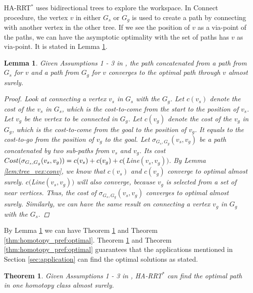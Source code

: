 \documentclass[letterpaper, 10 pt, conference]{ieeeconf}
\newtheorem{thm}{Theorem}
\newtheorem{lem}{Lemma}
\begin{document}
HA-RRT$^{*}$ uses bidirectional trees to explore the workspace.
In {\sc Connect} procedure, the vertex $ v $ in either $ G_{s} $ or $ G_{g} $ is used to create a path by connecting with another vertex in the other tree.
If we see the position of $ v $ as a via-point of the paths, we can have the asymptotic optimality with the set of paths has $ v $ as via-point.
It is stated in Lemma \ref{lem:optimal_via_point}.

\begin{lem}
\label{lem:optimal_via_point}
Given Assumptions 1 - 3 in \cite{Karaman-RSS-10},
the path concatenated from a path from $ G_{s} $ for $ v $ and a path from $ G_{g} $ for $ v $ converges to the optimal path through $ v $ almost surely. 

\begin{proof}
Look at connecting a vertex $ v_{s} $ in $ G_{s} $ with the $ G_{g} $.
Let $ c (v_{s}) $ denote the cost of the $  v_{s}  $ in $ G_{s} $, which is the cost-to-come from the start to the position of $  v_{s} $.
Let $ v_{g} $ be the vertex to be connected in $ G_{g} $.
Let $ c ( v_{g} ) $ denote the cost of the $  v_{g} $ in $ G_{g} $, which is the cost-to-come from the goal to the position of $  v_{g} $.
It equals to the cost-to-go from the position of $ v_{g} $ to the goal.
Let $ \sigma_{G_{s},G_{g}} (v_{s}, v_{g}) $ be a path concatenated by two sub-paths from $  v_{s} $ and $  v_{g} $. 
Its cost $ {\sc Cost} (\sigma_{G_{s},G_{g}} ( v_{s}, v_{g} )) =  c (v_{s}) + c (v_{g}) + c (${\sc Line}$ (v_{s}, v_{g})  ) $.
By Lemma \ref{lem:tree_vex:conv}, we know that $ c (v_{s}) $ and $ c (v_{g}) $ converge to optimal almost surely.
$ c (${\sc Line}$ (v_{s}, v_{g})  ) $ will also converge, because $ v_{g} $ is selected from a set of near vertices.
Thus, the cost of $ \sigma_{G_{s},G_{g}} (v_{s}, v_{g}) $ converges to optimal almost surely. 
Similarly, we can have the same result on connecting a vertex $ v_{g} $ in $ G_{g} $ with the $ G_{s} $.
\end{proof}
\end{lem}

By Lemma \ref{lem:optimal_via_point} we can have Theorem \ref{thm:constrained_optimality} and Theorem \ref{thm:homotopy_pref:optimal}.
Theorem \ref{thm:constrained_optimality} and Theorem \ref{thm:homotopy_pref:optimal} guarantees that the applications mentioned in Section \ref{sec:application} can find the optimal solutions as stated.

\begin{thm}
\label{thm:constrained_optimality}
Given Assumptions 1 - 3 in \cite{Karaman-RSS-10},
HA-RRT$^{*}$ can find the optimal path in one homotopy class almost surely.
\end{thm}
\end{document}
